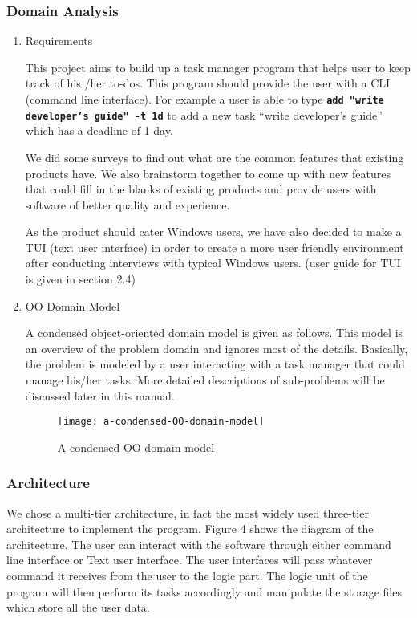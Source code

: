 \documentclass[12pt, a4paper]{article}
\newcommand{\cmdinline}[1]{{\bf \texttt{#1}}}
\begin{document}
\subsubsection{Domain Analysis}
\begin{enumerate} 
\item Requirements

This project aims to build up a task manager program that helps user to keep track of his /her
to-dos. This program should provide the user with a CLI (command line interface). For example a
user is able to type \mbox{\cmdinline{add "write developer's guide" -t 1d}} to add a new task ``write developer's guide'' which has a deadline of 1 day.

We did some surveys to find out what are the common features that existing products have. We also brainstorm together to come up with new features that could
fill in the blanks of existing products and provide users with software of better quality and experience.

As the product should cater Windows users, we have also decided to make a TUI (text user interface) in order to create a
more user friendly environment after conducting interviews with typical Windows users. (user guide for TUI is given in section 2.4)

\item OO Domain Model

A condensed object-oriented domain model is given as follows. This model is an overview of the
problem domain and ignores most of the details. Basically, the problem is modeled by a user
interacting with a task manager that could manage his/her tasks. More detailed descriptions of
sub-problems will be discussed later in this manual.

\begin{figure}[h]
  \centering
  \texttt{[image: a-condensed-OO-domain-model]}
  \caption{A condensed OO domain model}
\end{figure}
\end{enumerate}

\subsubsection{Architecture}
We chose a multi-tier architecture, in fact the most widely used
three-tier architecture to implement the program. Figure 4 shows the diagram of
the architecture. The user can interact with the software through either command line interface
or Text user interface. The user interfaces will pass whatever command it receives from the user to the logic part.
The logic unit of the program will then perform its tasks accordingly and manipulate the storage
files which store all the user data.
\end{document}
